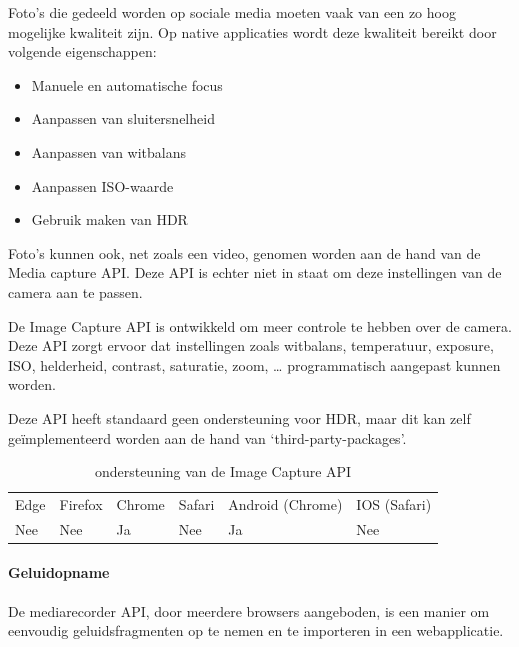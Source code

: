Foto’s die gedeeld worden op sociale media moeten vaak van een zo hoog mogelijke kwaliteit zijn. Op native applicaties wordt deze kwaliteit bereikt door volgende eigenschappen: 

 \begin{itemize}
     \item Manuele en automatische focus
     \item Aanpassen van sluitersnelheid
     \item Aanpassen van witbalans
     \item Aanpassen ISO-waarde
     \item Gebruik maken van HDR 
   \end{itemize}

Foto’s kunnen ook, net zoals een video, genomen worden aan de hand van de Media capture API. Deze API is echter niet in staat om deze instellingen van de camera aan te passen.

De Image Capture API \autocite{Mandyam2020} is ontwikkeld om meer controle te hebben over de camera. Deze API zorgt ervoor dat instellingen zoals witbalans, temperatuur, exposure, ISO, helderheid, contrast, saturatie, zoom, … programmatisch aangepast kunnen worden.

Deze API heeft standaard geen ondersteuning voor HDR, maar dit kan zelf geïmplementeerd worden aan de hand van ‘third-party-packages’.

\autocite{Bhaumik2019}

\begin{table}[H]
	\centering
	\begin{tabular}{llllll}
		Edge & Firefox & Chrome & Safari & Android (Chrome) & IOS (Safari) \\
		Nee   & Nee      & Ja     & Nee     & Ja               & Nee          
	\end{tabular}	
	\caption{ondersteuning van de Image Capture API}
	\label{ondersteuning van de Image Capture API}
\end{table}



\paragraph{Geluidopname }



De mediarecorder API, \autocite{CasasSanchez2020} door meerdere browsers aangeboden, is een manier om eenvoudig geluidsfragmenten op te nemen en te importeren in een webapplicatie.


